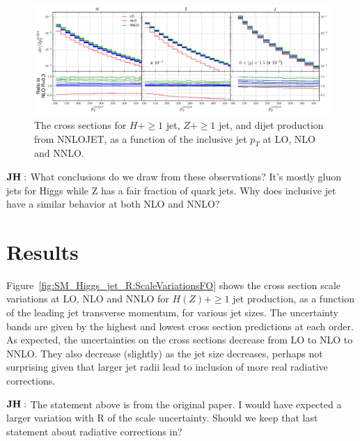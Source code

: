 \documentclass[aps,prd,onecolumn,fleqn,superscriptaddress,groupedaddress,nofootinbib,preprintnumbers,nobalancelastpage]{revtex4}
\begin{document}
\begin{figure}
\includegraphics[width=\textwidth]{plots/Comparison_Plot.pdf}
\caption{The cross sections for $H +\ge1$ jet, $Z +\ge1$ jet, and dijet production from 
NNLOJET, as a function of the inclusive jet $p_T$ at LO, NLO and NNLO. }
\label{fig:Comparison_plot}
\end{figure}

$\bf JH:$ What conclusions do we draw from these observations? It's mostly gluon jets for Higgs while Z has a fair fraction of quark jets. Why does inclusive jet have a similar behavior at both NLO and NNLO? 





\section{Results}

Figure~\ref{fig:SM_Higgs_jet_R:ScaleVariationsFO} shows the cross section scale variations at
LO, NLO and NNLO for $H(Z) +\ge1$ jet production, as a function of the leading jet
transverse momentum, for various jet sizes. The uncertainty bands are given by the
highest and lowest cross section predictions at each order. As expected, the
uncertainties on the cross sections decrease from LO to NLO to NNLO. They also
decrease (slightly) as the jet size decreases, perhaps not surprising given that larger
jet radii lead to inclusion of more real radiative corrections.  

$\bf JH:$ The statement above is from the original paper. I would have expected a larger variation with R of the scale uncertainty. Should we keep that last statement about radiative corrections in? 
\end{document}
